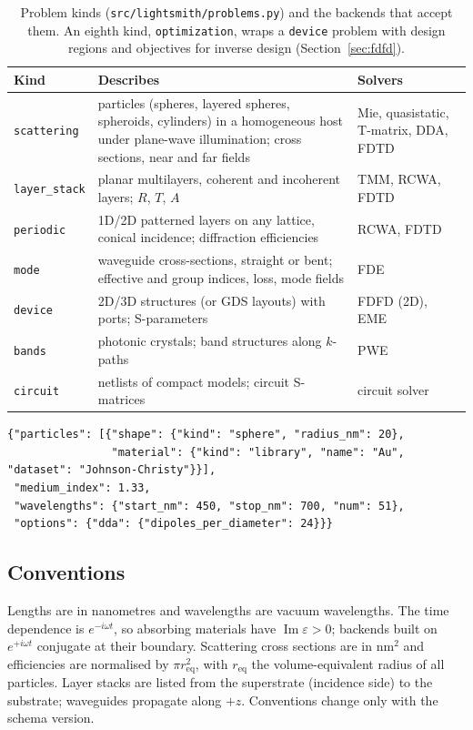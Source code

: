 \documentclass[11pt]{article}
\newcommand{\code}[1]{\texttt{#1}}
\begin{document}
\begin{table}[t]
\centering\small
\begin{tabularx}{\linewidth}{@{}lXl@{}}
\toprule
Kind & Describes & Solvers \\
\midrule
\code{scattering} & particles (spheres, layered spheres, spheroids, cylinders) in a homogeneous host under plane-wave illumination; cross sections, near and far fields & Mie, quasistatic, T-matrix, DDA, FDTD \\
\code{layer\_stack} & planar multilayers, coherent and incoherent layers; $R$, $T$, $A$ & TMM, RCWA, FDTD \\
\code{periodic} & 1D/2D patterned layers on any lattice, conical incidence; diffraction efficiencies & RCWA, FDTD \\
\code{mode} & waveguide cross-sections, straight or bent; effective and group indices, loss, mode fields & FDE \\
\code{device} & 2D/3D structures (or GDS layouts) with ports; S-parameters & FDFD (2D), EME \\
\code{bands} & photonic crystals; band structures along $k$-paths & PWE \\
\code{circuit} & netlists of compact models; circuit S-matrices & circuit solver \\
\bottomrule
\end{tabularx}
\caption{Problem kinds (\code{src/lightsmith/problems.py}) and the backends that accept them. An
eighth kind, \code{optimization}, wraps a \code{device} problem with design regions and objectives
for inverse design (Section~\ref{sec:fdfd}).}
\label{tab:kinds}
\end{table}

\begin{lstlisting}[caption={A scattering problem: a 20\,nm-radius gold sphere in water. Solver options
are optional and keyed by method or backend.},label={lst:spec}]
{"particles": [{"shape": {"kind": "sphere", "radius_nm": 20},
                "material": {"kind": "library", "name": "Au", "dataset": "Johnson-Christy"}}],
 "medium_index": 1.33,
 "wavelengths": {"start_nm": 450, "stop_nm": 700, "num": 51},
 "options": {"dda": {"dipoles_per_diameter": 24}}}
\end{lstlisting}

\subsection{Conventions}
Lengths are in nanometres and wavelengths are vacuum wavelengths. The time dependence is
$e^{-i\omega t}$, so absorbing materials have $\operatorname{Im}\varepsilon>0$; backends built on
$e^{+i\omega t}$ conjugate at their boundary. Scattering cross sections are in nm$^2$ and
efficiencies are normalised by $\pi r_\mathrm{eq}^2$, with $r_\mathrm{eq}$ the volume-equivalent
radius of all particles. Layer stacks are listed from the superstrate (incidence side) to the
substrate; waveguides propagate along $+z$. Conventions change only with the schema version.
\end{document}
